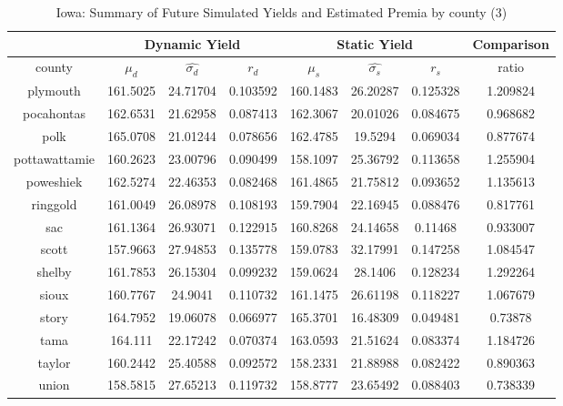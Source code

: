 \begin{table}[H]\centering
\caption{Iowa: Summary of Future Simulated Yields and Estimated Premia by county (3)}
\label{my-label}
\begin{tabular}{|c|ccc|ccc|c|}

\hline
\multicolumn{1}{|c}{} & \multicolumn{3}{|c}{Dynamic Yield} & \multicolumn{3}{|c}{Static Yield} & \multicolumn{1}{|c|}{Comparison}\\ 
\hline
county        & $\mu_d$ & $\hat{\sigma_d}$ & $r_d$ & $\mu_s$ & $\hat{\sigma_s}$ & $r_s$ & ratio \\
\hline


plymouth      & 161.5025 & 24.71704       & 0.103592 & 160.1483 & 26.20287       & 0.125328 & 1.209824 \\
pocahontas    & 162.6531 & 21.62958       & 0.087413 & 162.3067 & 20.01026       & 0.084675 & 0.968682 \\
polk          & 165.0708 & 21.01244       & 0.078656 & 162.4785 & 19.5294        & 0.069034 & 0.877674 \\
pottawattamie & 160.2623 & 23.00796       & 0.090499 & 158.1097 & 25.36792       & 0.113658 & 1.255904 \\
poweshiek     & 162.5274 & 22.46353       & 0.082468 & 161.4865 & 21.75812       & 0.093652 & 1.135613 \\
ringgold      & 161.0049 & 26.08978       & 0.108193 & 159.7904 & 22.16945       & 0.088476 & 0.817761 \\
sac           & 161.1364 & 26.93071       & 0.122915 & 160.8268 & 24.14658       & 0.11468  & 0.933007 \\
scott         & 157.9663 & 27.94853       & 0.135778 & 159.0783 & 32.17991       & 0.147258 & 1.084547 \\
shelby        & 161.7853 & 26.15304       & 0.099232 & 159.0624 & 28.1406        & 0.128234 & 1.292264 \\
sioux         & 160.7767 & 24.9041        & 0.110732 & 161.1475 & 26.61198       & 0.118227 & 1.067679 \\
story         & 164.7952 & 19.06078       & 0.066977 & 165.3701 & 16.48309       & 0.049481 & 0.73878  \\
tama          & 164.111  & 22.17242       & 0.070374 & 163.0593 & 21.51624       & 0.083374 & 1.184726 \\
taylor        & 160.2442 & 25.40588       & 0.092572 & 158.2331 & 21.88988       & 0.082422 & 0.890363 \\
union         & 158.5815 & 27.65213       & 0.119732 & 158.8777 & 23.65492       & 0.088403 & 0.738339 \\

\end{tabular}
\end{table}
